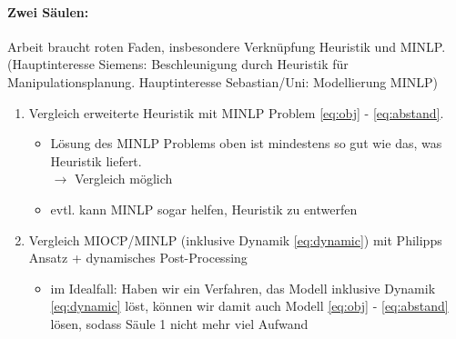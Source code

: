\documentclass{article}
\begin{document}
\paragraph{Zwei S\"aulen:} Arbeit braucht roten Faden, insbesondere Verknüpfung Heuristik und MINLP. (Hauptinteresse Siemens: Beschleunigung durch Heuristik f\"ur Manipulationsplanung. Hauptinteresse Sebastian/Uni: Modellierung MINLP)
\begin{enumerate}
\item Vergleich  erweiterte Heuristik mit MINLP Problem \eqref{eq:obj} - \eqref{eq:abstand}.
	\begin{itemize}
	\item L\"osung des MINLP Problems oben ist mindestens so gut wie das, was Heuristik liefert. \\$\rightarrow$ Vergleich m\"oglich
	\item evtl. kann MINLP sogar helfen, Heuristik zu entwerfen
	\end{itemize}
\item Vergleich MIOCP/MINLP (inklusive Dynamik \eqref{eq:dynamic}) mit Philipps Ansatz + dynamisches Post-Processing
	\begin{itemize}
	\item im Idealfall: Haben wir ein Verfahren, das Modell inklusive Dynamik \eqref{eq:dynamic} l\"ost, k\"onnen wir damit auch Modell \eqref{eq:obj} - \eqref{eq:abstand} l\"osen, sodass S\"aule 1 nicht mehr viel Aufwand
	\end{itemize}
\end{enumerate}
\end{document}
